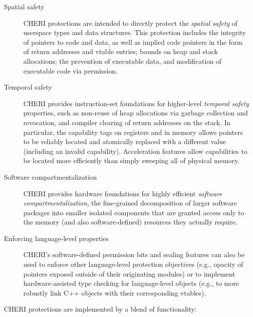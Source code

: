 \begin{description}
\item[Spatial safety]
CHERI protections are intended to directly protect the \textit{spatial safety}
of userspace types and data structures.  This protection includes
the integrity of pointers to code and
data, as well as implied code pointers in the form of return addresses and
vtable entries; bounds on heap and stack allocations; the  prevention
of executable data, and modification of executable code via permission.

\item[Temporal safety]
CHERI provides instruction-set foundations for higher-level \textit{temporal
safety} properties, such as non-reuse of heap allocations via garbage
collection and revocation, and compiler clearing of return addresses on the
stack.
In particular, the capability tags on registers and in memory allows pointers
to be reliably located and atomically replaced with a different value
(including an invalid capability).
Acceleration features allow capabilities to be located more efficiently than
simply sweeping all of physical memory.

\item[Software compartmentalization]
CHERI provides hardware foundations for highly efficient
\textit{software compartmentalization}, the fine-grained decomposition of
larger software packages into
smaller isolated components that are
granted access
only to the memory (and also software-defined) resources they actually require.

\item[Enforcing language-level properties]
CHERI's software-defined permission bits and sealing features can also be used
to enforce other language-level protection objectives (e.g., opacity of
pointers exposed outside of their originating modules) or to implement
hardware-assisted type checking for language-level objects (e.g., to more
robustly link C++ objects with their corresponding vtables).

\end{description}

\noindent
CHERI protections are implemented by a blend of
functionality:


